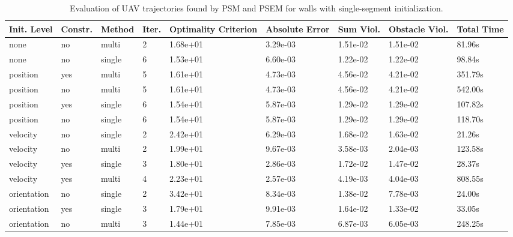 \begin{table}
\small

\caption{Evaluation of UAV trajectories found by PSM and PSEM for walls with single-segment initialization.}
\label{tab:traj-plan-eval-walls-single}
\begin{tabular}{p{21mm}p{9mm}p{12mm}p{6mm}p{14mm}p{14mm}p{14mm}p{14mm}p{14mm}}
\toprule
Init. Level & Constr. & Method & Iter. & Optimality Criterion & Absolute Error & Sum Viol. & Obstacle Viol. & Total Time \\
\midrule
none & no & multi & \cellcolor{color3} 2 & 1.68e+01 & 3.29e-03 & 1.51e-02 & 1.51e-02 & 81.96s \\
none & no & single & \cellcolor{color8} 6 & \cellcolor{color10} 1.53e+01 & 6.60e-03 & 1.22e-02 & 1.22e-02 & 98.84s \\
position & yes & multi & 5 & 1.61e+01 & 4.73e-03 & \cellcolor{color8} 4.56e-02 & \cellcolor{color8} 4.21e-02 & 351.79s \\
position & no & multi & 5 & 1.61e+01 & 4.73e-03 & \cellcolor{color8} 4.56e-02 & \cellcolor{color8} 4.21e-02 & \cellcolor{color9} 542.00s \\
position & yes & single & \cellcolor{color8} 6 & 1.54e+01 & 5.87e-03 & 1.29e-02 & 1.29e-02 & 107.82s \\
position & no & single & \cellcolor{color8} 6 & 1.54e+01 & 5.87e-03 & 1.29e-02 & 1.29e-02 & 118.70s \\
velocity & no & single & \cellcolor{color3} 2 & 2.42e+01 & 6.29e-03 & 1.68e-02 & 1.63e-02 & \cellcolor{color3} 21.26s \\
velocity & no & multi & \cellcolor{color3} 2 & 1.99e+01 & \cellcolor{color9} 9.67e-03 & \cellcolor{color3} 3.58e-03 & \cellcolor{color3} 2.04e-03 & 123.58s \\
velocity & yes & single & 3 & 1.80e+01 & 2.86e-03 & 1.72e-02 & 1.47e-02 & 28.37s \\
velocity & yes & multi & 4 & 2.23e+01 & \cellcolor{color10} 2.57e-03 & \cellcolor{color10} 4.19e-03 & \cellcolor{color10} 4.04e-03 & \cellcolor{color8} 808.55s \\
orientation & no & single & \cellcolor{color3} 2 & \cellcolor{color8} 3.42e+01 & 8.34e-03 & 1.38e-02 & 7.78e-03 & 24.00s \\
orientation & yes & single & 3 & 1.79e+01 & \cellcolor{color8} 9.91e-03 & 1.64e-02 & 1.33e-02 & 33.05s \\
orientation & no & multi & 3 & \cellcolor{color3} 1.44e+01 & 7.85e-03 & 6.87e-03 & 6.05e-03 & 248.25s \\

\end{tabular}
\end{table}

